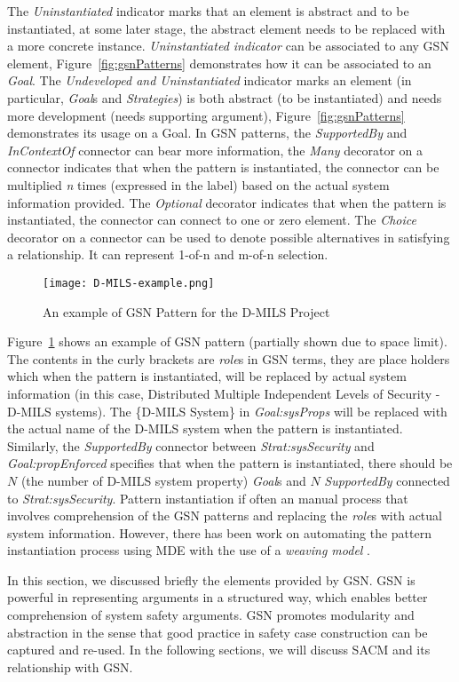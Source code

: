 The \textit{Uninstantiated} indicator marks that an element is abstract and to be instantiated, at some later stage, the abstract element needs to be replaced with a more concrete instance. \textit{Uninstantiated indicator} can be associated to any GSN element, Figure~\ref{fig:gsnPatterns} demonstrates how it can be associated to an \textit{Goal}. The \textit{Undeveloped and Uninstantiated} indicator marks an element (in particular, \textit{Goal}s and \textit{Strategies}) is both abstract (to be instantiated) and needs more development (needs supporting argument), Figure~\ref{fig:gsnPatterns} demonstrates its usage on a Goal. In GSN patterns, the \textit{SupportedBy} and \textit{InContextOf} connector can bear more information, the \textit{Many} decorator on a connector indicates that when the pattern is instantiated, the connector can be multiplied \textit{n} times (expressed in the label) based on the actual system information provided. The \textit{Optional} decorator indicates that when the pattern is instantiated, the connector can connect to one or zero element. The \textit{Choice} decorator on a connector can be used to denote possible alternatives in satisfying a relationship. It can represent 1-of-n and m-of-n selection. 

\begin{figure}[ht!]
	\centering
	\texttt{[image: D-MILS-example.png]}
	\caption{An example of GSN Pattern for the D-MILS Project \cite{}}
	\label{fig:dmilsPattern}
\end{figure}

Figure~\ref{fig:dmilsPattern} shows an example of GSN pattern (partially shown due to space limit). The contents in the curly brackets are \textit{role}s in GSN terms, they are place holders which when the pattern is instantiated, will be replaced by actual system information (in this case, Distributed Multiple Independent Levels of Security - D-MILS systems). The \{D-MILS System\} in \textit{Goal:sysProps} will be replaced with the actual name of the D-MILS system when the pattern is instantiated. Similarly, the \textit{SupportedBy} connector between \textit{Strat:sysSecurity} and \textit{Goal:propEnforced} specifies that when the pattern is instantiated, there should be $N$ (the number of D-MILS system property) \textit{Goal}s and $N$ \textit{SupportedBy} connected to \textit{Strat:sysSecurity}. Pattern instantiation if often an manual process that involves comprehension of the GSN patterns and replacing the \textit{role}s with actual system information. However, there has been work on automating the pattern instantiation process using MDE with the use of a \textit{weaving model} \cite{}. 

In this section, we discussed briefly the elements provided by GSN. GSN is powerful in representing arguments in a structured way, which enables better comprehension of system safety arguments. GSN promotes modularity and abstraction in the sense that good practice in safety case construction can be captured and re-used. In the following sections, we will discuss SACM and its relationship with GSN. 